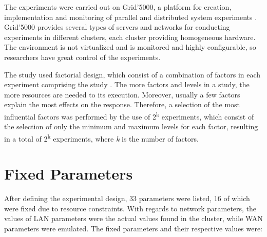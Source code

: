 \documentclass[doublespacing]{bmcart}
\begin{document}
The experiments were carried out on Grid'5000, a platform for creation,
implementation and monitoring of parallel and distributed system experiments
\cite{Grid50002013}. Grid'5000 provides several types of servers and networks
for conducting experiments in different clusters, each cluster providing
homogeneous hardware. The environment is not virtualized and is monitored and
highly configurable, so researchers have great control of the experiments.

The study used factorial design, which consist of a combination of factors in
each experiment comprising the study \cite{Jain1991}. The more factors and
levels in a study, the more resources are needed to its execution.  Moreover,
usually a few factors explain the most effects on the response. Therefore, a
selection of the most influential factors was performed by the use of
2\textsuperscript{k} experiments, which consist of the selection of only the
minimum and maximum levels for each factor, resulting in a total of
2\textsuperscript{k} experiments, where \textit{k} is the number of factors.

\section{Fixed Parameters}

After defining the experimental design, 33 parameters were listed, 16 of which
were fixed due to resource constraints. With regards to network parameters, the
values of LAN parameters were the actual values found in the cluster, while WAN
parameters were emulated. The fixed parameters and their respective values
were:
\end{document}

